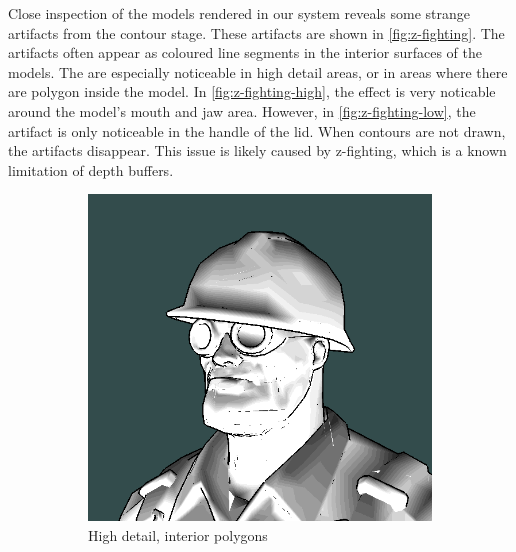 Close inspection of the models rendered in our system reveals some strange artifacts from the contour stage. These 
artifacts are shown in \autoref{fig:z-fighting}. The artifacts often appear as coloured line segments in the interior 
surfaces of the models. The are especially noticeable in high detail areas, or in areas where there are polygon inside 
the model. In \autoref{fig:z-fighting-high}, the effect is very noticable around the model's mouth and jaw area. 
However, in \autoref{fig:z-fighting-low}, the artifact is only noticeable in the handle of the lid. When contours are 
not drawn, the artifacts disappear. This issue is likely caused by z-fighting, which is a known limitation of depth 
buffers.

\begin{figure}[h]
    \centering
    \begin{subfigure}[b]{0.35\textwidth}
        \includegraphics[width=\textwidth]{img/z-fighting-engineer}
        \caption{High detail, interior polygons}
        \label{fig:z-fighting-high}
    \end{subfigure}
    ~
    \begin{subfigure}[b]{0.35\textwidth}

\end{subfigure}
\end{figure}
